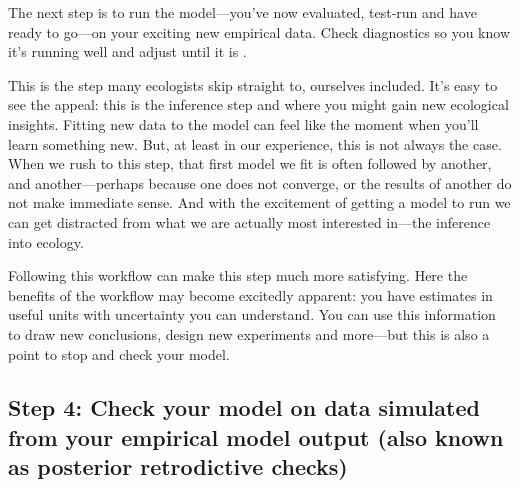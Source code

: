 \documentclass[11pt]{article}
\begin{document}
The next step is to run the model---you've now evaluated, test-run and have ready to go---on your exciting new empirical data. Check diagnostics so you know it's running well and adjust until it is \citep[this includes a suite of convergence and efficiency metrics that are well-discussed elsewhere,][]{betanworkflow,gelman2020bayesian,vandeschoot2021,gabryvis}. %
 
This is the step many ecologists skip straight to, ourselves included. It's easy to see the appeal: this is the inference step and where you might gain new ecological insights. Fitting new data to the model can feel like the moment when you'll learn something new. But, at least in our experience, this is not always the case. When we rush to this step, that first model we fit is often followed by another, and another---perhaps because one does not converge, or the results of another do not make immediate sense. And with the excitement of getting a model to run we can get distracted from what we are actually most interested in---the inference into ecology. %

Following this workflow can make this step much more satisfying. Here the benefits of the workflow may become excitedly apparent: you have estimates in useful units with uncertainty you can understand. You can use this information to draw new conclusions, design new experiments and more---but this is also a point to stop and check your model. 

\subsection*{Step 4: Check your model on data simulated from your empirical model output (also known as posterior retrodictive checks)} 
\end{document}
